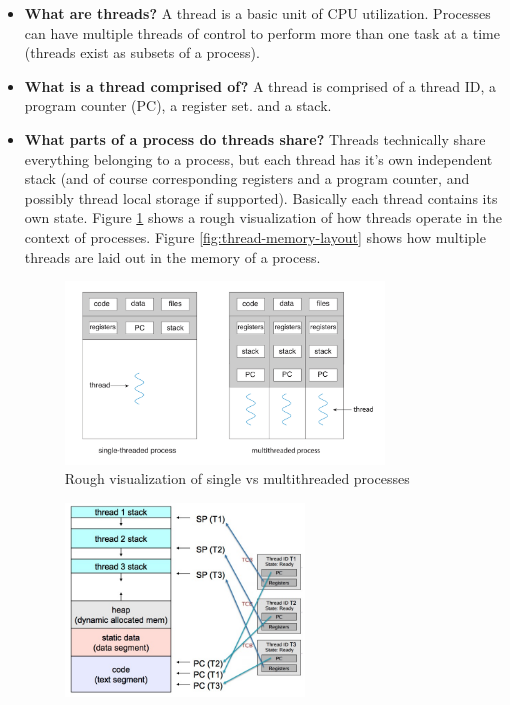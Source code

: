 \documentclass[12pt]{article}
\begin{document}
\begin{itemize}
    \item \textbf{What are threads?} A thread is a basic unit of CPU utilization. Processes can have multiple threads of control to perform more than one task at a time (threads exist as subsets of a process).
    \item \textbf{What is a thread comprised of?} A thread is comprised of a thread ID, a program counter (PC), a register set. and a stack.
    \item \textbf{What parts of a process do threads share?} Threads technically share everything belonging to a process, but each thread has it's own independent stack (and of course corresponding registers and a program counter, and possibly thread local storage if supported). Basically each thread contains its own state. Figure \ref{fig:thread-process} shows a rough visualization of how threads operate in the context of processes. Figure \ref{fig:thread-memory-layout} shows how multiple threads are laid out in the memory of a process.
        \begin{figure}[ht]
            \centering
            \includegraphics[width=0.8\textwidth]{figures/thread-process.jpg}
            \caption{Rough visualization of single vs multithreaded processes}
            \label{fig:thread-process}
        \end{figure}
        \begin{figure}[ht]
            \centering
            \includegraphics[width=0.6\textwidth]{figures/thread-memory-layout.jpg}

\end{figure}
\end{itemize}
\end{document}
